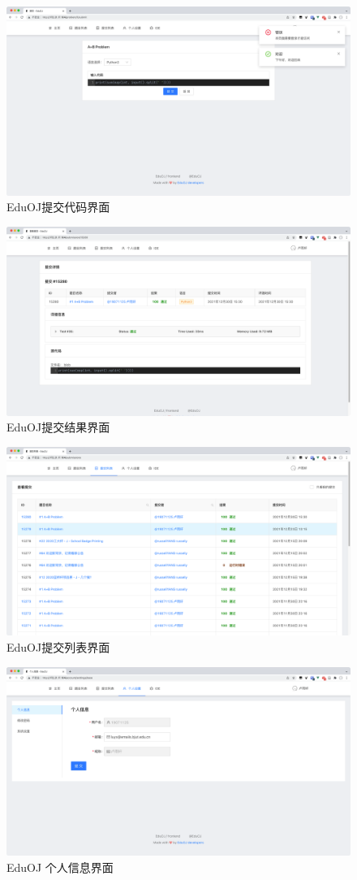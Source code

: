 \documentclass{ctexrep}
\begin{document}
\begin{appendix}
\begin{figure}
    \centering
    \includegraphics[width=0.8\linewidth]{EduOJ-4.png}
    \caption{EduOJ提交代码界面}
\end{figure}

\begin{figure}
    \centering
    \includegraphics[width=0.8\linewidth]{EduOJ-3.png}
    \caption{EduOJ提交结果界面}
\end{figure}

\begin{figure}
    \centering
    \includegraphics[width=0.8\linewidth]{EduOJ-1.png}
    \caption{EduOJ提交列表界面}
\end{figure}

\begin{figure}
    \centering
    \includegraphics[width=0.8\linewidth]{EduOJ-2.png}
    \caption{EduOJ 个人信息界面}
\end{figure}

\end{appendix}
\end{document}
